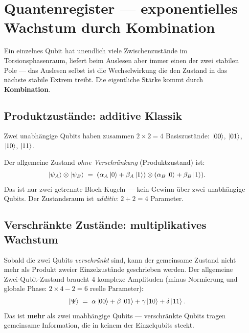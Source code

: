 \section{Quantenregister --- exponentielles Wachstum durch Kombination}
\label{sec:register}

Ein einzelnes Qubit hat unendlich viele Zwischenzustände
im Torsionsphasenraum, liefert beim Auslesen aber immer
einen der zwei stabilen Pole --- das Auslesen selbst
ist die Wechselwirkung die den Zustand in das nächste
stabile Extrem treibt. Die eigentliche Stärke kommt
durch \textbf{Kombination}.

\subsection{Produktzustände: additive Klassik}

Zwei unabhängige Qubits haben zusammen
$2 \times 2 = 4$ Basiszustände:
$\left|00\right\rangle$, $\left|01\right\rangle$, $\left|10\right\rangle$, $\left|11\right\rangle$.

Der allgemeine Zustand \emph{ohne Verschränkung}
(Produktzustand) ist:
\begin{equation}
  \left|\psi_A\right\rangle \otimes \left|\psi_B\right\rangle
  \;=\; (\alpha_A\left|0\right\rangle + \beta_A\left|1\right\rangle)
         \otimes
         (\alpha_B\left|0\right\rangle + \beta_B\left|1\right\rangle).
\end{equation}
Das ist nur zwei getrennte Bloch-Kugeln ---
kein Gewinn über zwei unabhängige Qubits.
Der Zustandsraum ist \emph{additiv}: $2 + 2 = 4$ Parameter.

\subsection{Verschränkte Zustände: multiplikatives Wachstum}
\label{sec:verschraenkung}

Sobald die zwei Qubits \emph{verschränkt} sind,
kann der gemeinsame Zustand nicht mehr als Produkt
zweier Einzelzustände geschrieben werden.
Der allgemeine Zwei-Qubit-Zustand braucht
$4$ komplexe Amplituden (minus Normierung und
globale Phase: $2 \times 4 - 2 = 6$ reelle Parameter):
\begin{equation}
  \left|\Psi\right\rangle \;=\; \alpha\left|00\right\rangle + \beta\left|01\right\rangle
              + \gamma\left|10\right\rangle + \delta\left|11\right\rangle.
\end{equation}
Das ist \textbf{mehr} als zwei unabhängige Qubits ---
verschränkte Qubits tragen gemeinsame Information,
die in keinem der Einzelqubits steckt.

